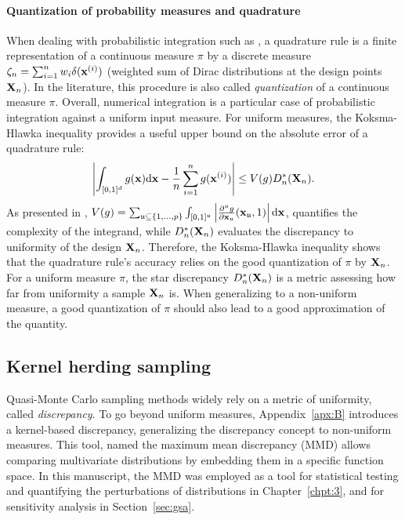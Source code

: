 \paragraph{Quantization of probability measures and quadrature}
When dealing with probabilistic integration such as , a quadrature rule is a finite representation of a continuous measure $\pi$ by a discrete measure $\zeta_n = \sum_{i=1}^n w_i \delta({\bf x}^{(i)})$ (weighted sum of Dirac distributions at the design points ${\bf X}_n$).
In the literature, this procedure is also called \emph{quantization} of a continuous measure $\pi$. 
Overall, numerical integration is a particular case of probabilistic integration against a uniform input measure. 
For uniform measures, the Koksma-Hlawka inequality \citep{morokoff_1995} provides a useful upper bound on the absolute error of a quadrature rule: 
\begin{equation}
    \left| \int_{[0, 1]^d} g({\bf x}) \mathrm{d} {\bf x} - \frac1n \sum_{i=1}^n g({\bf x}^{(i)})\right| \leq  V(g) D_n^*({\bf X}_n).
    \label{eq:KH_inequality}
\end{equation}
As presented in \cite{oates_21}, $V(g) = \sum_{\mathfrak{u}\subseteq\{1, \dots, p \}} \int_{[0, 1]^\mathfrak{u}} \left| \frac{\partial^{\mathfrak{u}}g}{\partial {\bf x}_{\mathfrak{u}}}({\bf x}_{\mathfrak{u}}, 1)\right| \mathrm{d}{\bf x}$, quantifies the complexity of the integrand, 
while $D_n^*({\bf X}_n)$ evaluates the discrepancy to uniformity of the design ${\bf X}_n$. 
Therefore, the Koksma-Hlawka inequality shows that the quadrature rule's accuracy relies on the good quantization of $\pi$ by ${\bf X}_n$. 
For a uniform measure $\pi$, the star discrepancy $D_n^*({\bf X}_n)$ is a metric assessing how far from uniformity a sample ${\bf X}_n$ is. 
When generalizing to a non-uniform measure, a good quantization of $\pi$ should also lead to a good approximation of the quantity. 


\subsection{Kernel herding sampling}\label{sec:4khsubsec}

Quasi-Monte Carlo sampling methods widely rely on a metric of uniformity, called \textit{discrepancy}. 
To go beyond uniform measures, Appendix~\ref{apx:B} introduces a kernel-based discrepancy, generalizing the discrepancy concept to non-uniform measures. 
This tool, named the maximum mean discrepancy (MMD) allows comparing multivariate distributions by embedding them in a specific function space. 
In this manuscript, the MMD was employed as a tool for statistical testing and quantifying the perturbations of distributions in Chapter~\ref{chpt:3}, and for sensitivity analysis in Section~\ref{sec:gsa}.

